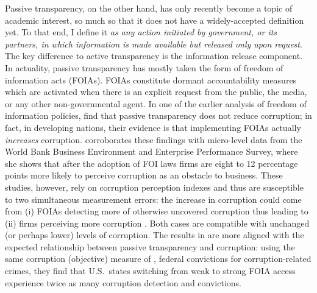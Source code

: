 \documentclass[11pt]{article}
\begin{document}
Passive transparency, on the other hand, has only recently become a topic of academic interest, so much so that it does not have a widely-accepted definition yet. To that end, I define it \emph{as any action initiated by government, or its partners, in which information is made available but released only upon request}. The key difference to active transparency is the information release component. In actuality, passive transparency has mostly taken the form of freedom of information acts (FOIAs). FOIAs constitute dormant accountability measures which are activated when there is an explicit request from the public, the media, or any other non-governmental agent. In one of the earlier analysis of freedom of information policies, \citet{EscalerasFreedominformationacts2010} find that passive transparency does not reduce corruption; in fact, in developing nations, their evidence is that implementing FOIAs actually \emph{increases} corruption. \citet{CostaFreedomInformationLaws2013} corroborates these findings with micro-level data from the World Bank Business Environment and Enterprise Performance Survey, where she shows that after the adoption of FOI laws firms are eight to 12 percentage points more likely to perceive corruption as an obstacle to business. These studies, however, rely on corruption perception indexes and thus are susceptible to two simultaneous measurement errors: the increase in corruption could come from (i) FOIAs detecting more of otherwise uncovered corruption \citep[an issue in ][]{EscalerasFreedominformationacts2010} thus leading to (ii) firms perceiving more corruption \citep[an issue in][]{CostaFreedomInformationLaws2013}. Both cases are compatible with unchanged (or perhaps lower) levels of corruption. The results in \citet{CordisSunshineDisinfectantEffect2014} are more aligned with the expected relationship between passive transparency and corruption: using the same corruption (objective) measure of \citet{CampanteIsolatedCapitalCities2014}, federal convictions for corruption-related crimes, they find that U.S.~states switching from weak to strong FOIA access experience twice as many corruption detection and convictions.
\end{document}
